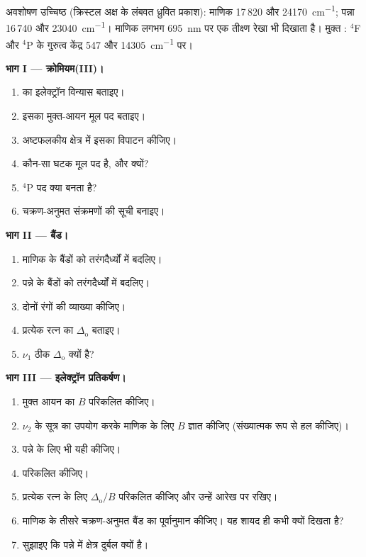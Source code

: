 \begin{problem}
\label{pb:b3:complex-spectra-magnetism:1}
अवशोषण उच्चिष्ठ (क्रिस्टल अक्ष के लंबवत ध्रुवित प्रकाश): माणिक
17\,820 और \qty{24170}{cm^{-1}}; पन्ना 16\,740 और \qty{23040}{cm^{-1}}। माणिक लगभग \qty{695}{nm} पर एक तीक्ष्ण
रेखा भी दिखाता है। मुक्त : $^4$F और $^4$P के गुरुत्व केंद्र 547 और \qty{14305}{cm^{-1}} पर।

\medskip\noindent\textbf{भाग I --- क्रोमियम(III)।}
\begin{enumerate}
  \item {} का इलेक्ट्रॉन विन्यास बताइए।
  \item इसका मुक्त-आयन मूल पद बताइए।
  \item अष्टफलकीय क्षेत्र में इसका विपाटन कीजिए।
  \item कौन-सा घटक मूल पद है, और क्यों?
  \item $^4$P पद क्या बनता है?
  \item चक्रण-अनुमत संक्रमणों की सूची बनाइए।
\end{enumerate}

\medskip\noindent\textbf{भाग II --- बैंड।}
\begin{enumerate}[resume]
  \item माणिक के बैंडों को तरंगदैर्ध्यों में बदलिए।
  \item पन्ने के बैंडों को तरंगदैर्ध्यों में बदलिए।
  \item दोनों रंगों की व्याख्या कीजिए।
  \item प्रत्येक रत्न का $\Delta_{\mathrm o}$ बताइए।
  \item $\nu_1$ ठीक $\Delta_{\mathrm o}$ क्यों है?
\end{enumerate}

\medskip\noindent\textbf{भाग III --- इलेक्ट्रॉन प्रतिकर्षण।}
\begin{enumerate}[resume]
  \item मुक्त आयन का $B$ परिकलित कीजिए।
  \item $\nu_2$ के सूत्र का उपयोग करके माणिक के लिए $B$ ज्ञात कीजिए (संख्यात्मक रूप से हल कीजिए)।
  \item पन्ने के लिए भी यही कीजिए।
  \item {} परिकलित कीजिए।
  \item प्रत्येक रत्न के लिए $\Delta_{\mathrm o}/B$ परिकलित कीजिए और उन्हें आरेख पर रखिए।
  \item माणिक के तीसरे चक्रण-अनुमत बैंड का पूर्वानुमान कीजिए। यह शायद ही कभी क्यों दिखता है?
  \item सुझाइए कि पन्ने में क्षेत्र दुर्बल क्यों है।
\end{enumerate}


\end{problem}
